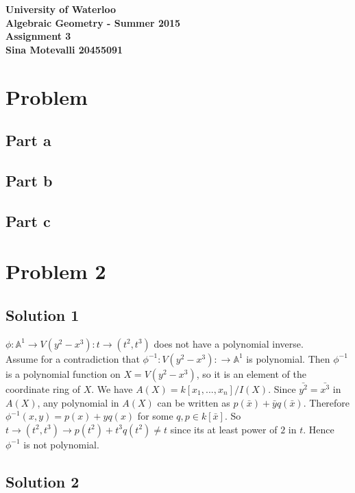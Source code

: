 \documentclass[12pt]{article}
\begin{document}
\begin{center}
  {\Large\bf University of Waterloo}\\
  \vspace{3mm}
         {\Large\bf Algebraic Geometry - Summer 2015}\\
         \vspace{2mm}
                {\Large\bf Assignment 3}\\
                \vspace{3mm}
                \textbf{Sina Motevalli 20455091}
\end{center}
\section*{Problem}
\subsection*{Part a}
\subsection*{Part b}
\subsection*{Part c}
\section*{Problem 2}
\subsection*{Solution 1}
$\phi: \mathbb{A}^1 \rightarrow V(y^2-x^3) : t \rightarrow (t^2,t^3)$ does not have a polynomial inverse. \\
Assume for a contradiction that $\phi^{-1}: V(y^2-x^3): \rightarrow \mathbb{A}^1$ is polynomial.
Then $\phi^{-1}$ is a polynomial function on $X=V(y^2-x^3)$, so it is an element of the coordinate ring of $X$.
We have $A(X)=k[x_1,...,x_n]/I(X)$. Since
$\bar{y^2}=\bar{x^3}$ in $A(X)$, any polynomial in $A(X)$ can be written as $p(\bar{x})+\bar{y}q(\bar{x})$.
Therefore $\phi^{-1} (x,y)=p(x)+yq(x)$ for some $q,p \in k[\bar{x}]$.
So $t \rightarrow (t^2,t^3) \rightarrow p(t^2) + t^3 q(t^2) \not=t$ since its at least power of $2$ in $t$. Hence $\phi^{-1}$ is not polynomial.
\subsection*{Solution 2}
\end{document}
